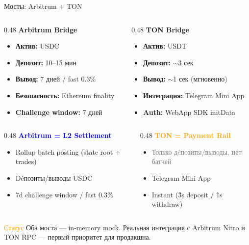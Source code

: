 \documentclass[aspectratio=169]{beamer}
\begin{document}
\begin{frame}{Мосты: Arbitrum + TON}

\begin{columns}[t]
\begin{column}{0.48\textwidth}
\textbf{Arbitrum Bridge}
\begin{itemize}
    \item \textbf{Актив:} USDC
    \item \textbf{Депозит:} 10--15 мин
    \item \textbf{Вывод:} 7 дней / fast 0.3\%
    \item \textbf{Безопасность:} Ethereum finality
    \item \textbf{Challenge window:} 7 дней
\end{itemize}
\end{column}
\begin{column}{0.48\textwidth}
\textbf{TON Bridge}
\begin{itemize}
    \item \textbf{Актив:} USDT
    \item \textbf{Депозит:} $\sim$3 сек
    \item \textbf{Вывод:} $\sim$1 сек (мгновенно)
    \item \textbf{Интеграция:} Telegram Mini App
    \item \textbf{Auth:} WebApp SDK initData
\end{itemize}
\end{column}
\end{columns}

\begin{columns}[t]
\begin{column}{0.48\textwidth}
\textcolor{blue}{\textbf{Arbitrum = L2 Settlement}}\\[0.2em]
\scriptsize
\begin{itemize}
    \item Rollup batch posting (state root + trades)
    \item D\'eпозиты/выводы USDC
    \item 7d challenge window / fast 0.3\%
\end{itemize}
\end{column}
\begin{column}{0.48\textwidth}
\textcolor{orange}{\textbf{TON = Payment Rail}}\\[0.2em]
\scriptsize
\begin{itemize}
    \item \textcolor{gray}{Только д\'eпозиты/выводы, нет батчей}
    \item Telegram Mini App
    \item Instant (\~3s deposit / \~1s withdraw)
\end{itemize}
\end{column}
\end{columns}

\vspace{0.5em}
\begin{block}{\textcolor{orange}{Статус}}
Оба моста --- in-memory mock. Реальная интеграция с Arbitrum Nitro и TON RPC --- первый приоритет для продакшна.
\end{block}
\end{frame}
\end{document}
